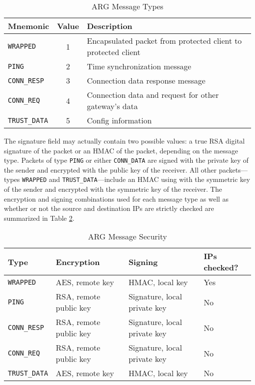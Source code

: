 \begin{table}
\caption{\ac{ARG} Message Types}
\label{tbl:arg_protocol_types}
\begin{tabular}{l|c|l}
\textbf{Mnemonic} & \textbf{Value} & \textbf{Description}\\
\hline
\texttt{WRAPPED} & 1 & Encapsulated packet from protected client to protected client\\
\texttt{PING} & 2 & Time synchronization message\\
\texttt{CONN\_RESP} & 3 & Connection data response message\\
\texttt{CONN\_REQ} & 4 & Connection data and request for other gateway's data\\ 
\texttt{TRUST\_DATA} & 5 & Config information 
\end{tabular}
\end{table}

\par The signature field may actually contain two possible values: a true \ac{RSA} digital signature of the packet or an \ac{HMAC} of the packet, depending on the message type. Packets of type \texttt{PING} or either \texttt{CONN\_DATA} are signed with the private key of the sender and encrypted with the public key of the receiver. All other packets---types \texttt{WRAPPED} and \texttt{TRUST\_DATA}---include an \ac{HMAC} using with the symmetric key of the sender and encrypted with the symmetric key of the receiver. The encryption and signing combinations used for each message type as well as whether or not the source and destination \ac{IP}s are strictly checked are summarized in Table \ref{tbl:arg_protocol_security}.

\begin{table}
\caption{\ac{ARG} Message Security}
\label{tbl:arg_protocol_security}
\centering
\begin{tabular}{l|l|l|l}
\textbf{Type} & \textbf{Encryption} & \textbf{Signing} & \textbf{\acp{IP} checked?}\\
\hline
\texttt{WRAPPED} & AES, remote key & HMAC, local key & Yes\\
\texttt{PING} & RSA, remote public key & Signature, local private key & No\\
\texttt{CONN\_RESP} & RSA, remote public key & Signature, local private key & No\\
\texttt{CONN\_REQ} & RSA, remote public key & Signature, local private key & No\\
\texttt{TRUST\_DATA} & AES, remote key & HMAC, local key & No\\
\end{tabular}
\end{table}

